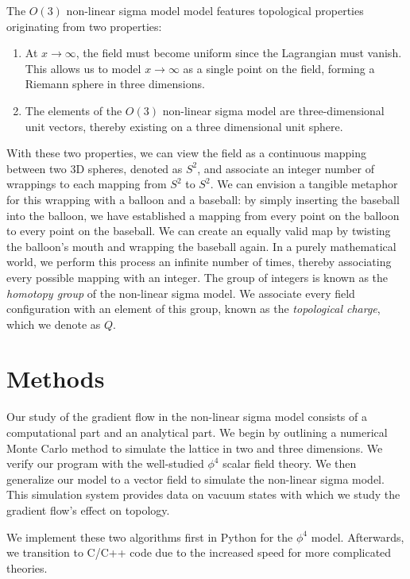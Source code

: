 \documentclass[12pt]{report}
\begin{document}
The $O(3)$ non-linear sigma model model features topological properties originating from two properties: 
\begin{enumerate}
    \item At $x\rightarrow\infty$, the field must become uniform since the Lagrangian must vanish. This allows us to model $x\rightarrow\infty$ as a single point on the field, forming a Riemann sphere in three dimensions.
    \item The elements of the $O(3)$ non-linear sigma model are three-dimensional unit vectors, thereby existing on a three dimensional unit sphere. 
\end{enumerate}

With these two properties, we can view the field as a continuous mapping between two 3D spheres, denoted as $S^2$, and associate an integer number of wrappings to each mapping from $S^2$ to $S^2$. We can envision a tangible metaphor for this wrapping with a balloon and a baseball: by simply inserting the baseball into the balloon, we have established a mapping from every point on the balloon to every point on the baseball. We can create an equally valid map by twisting the balloon's mouth and wrapping the baseball again. In a purely mathematical world, we perform this process an infinite number of times, thereby associating every possible mapping with an integer. The group of integers is known as the \textit{homotopy group} of the non-linear sigma model. We associate every field configuration with an element of this group, known as the \textit{topological charge}, which we denote as $Q$.


\chapter{Methods}
\label{sec:methods}
Our study of the gradient flow in the non-linear sigma model consists of a computational part and an analytical part. We begin by outlining a numerical Monte Carlo method to simulate the lattice in two and three dimensions. We verify our program with the well-studied $\phi^4$ scalar field theory. We then generalize our model to a vector field to simulate the non-linear sigma model. This simulation system provides data on vacuum states with which we study the gradient flow's effect on topology.

We implement these two algorithms first in Python for the $\phi^4$ model. Afterwards, we transition to C/C++ code due to the increased speed for more complicated theories. 
\end{document}
